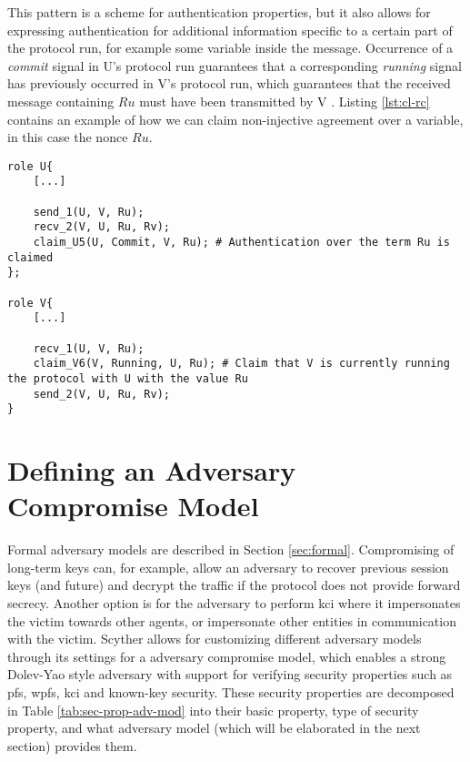 This pattern is a scheme for authentication properties, but it also allows for expressing authentication for additional information specific to a certain part of the protocol run, for example some variable inside the message. Occurrence of a \emph{commit} signal in U's protocol run guarantees that a corresponding \emph{running} signal has previously occurred in V's protocol run, which guarantees that the received message containing $Ru$ must have been transmitted by V \cite{ryan2001modelling}. Listing \ref{lst:cl-rc} contains an example of how we can claim non-injective agreement over a variable, in this case the nonce $Ru$. 
\newline
\newpage
\begin{lstlisting}[caption={Example of running and commit claims in Scyther to provide authentication for a set of terms.}, label={lst:cl-rc}]
role U{
	[...]
	
	send_1(U, V, Ru);
	recv_2(V, U, Ru, Rv);
	claim_U5(U, Commit, V, Ru); # Authentication over the term Ru is claimed
};

role V{
	[...]
	
	recv_1(U, V, Ru);
	claim_V6(V, Running, U, Ru); # Claim that V is currently running the protocol with U with the value Ru
	send_2(V, U, Ru, Rv); 
}
\end{lstlisting}

\section{Defining an Adversary Compromise Model}


Formal adversary models are described in Section \ref{sec:formal}. Compromising of long-term keys can, for example, allow an adversary to recover previous session keys (and future) and decrypt the traffic if the protocol does not provide forward secrecy. Another option is for the adversary to perform \gls{kci} where it impersonates the victim towards other agents, or impersonate other entities in communication with the victim. Scyther allows for customizing different adversary models through its settings for a adversary compromise model, which enables a strong Dolev-Yao style adversary with support for verifying security properties such as \gls{pfs}, \gls{wpfs}, \gls{kci} and known-key security. These security properties are decomposed in Table \ref{tab:sec-prop-adv-mod} into their basic property, type of security property, and what adversary model (which will be elaborated in the next section) provides them.


